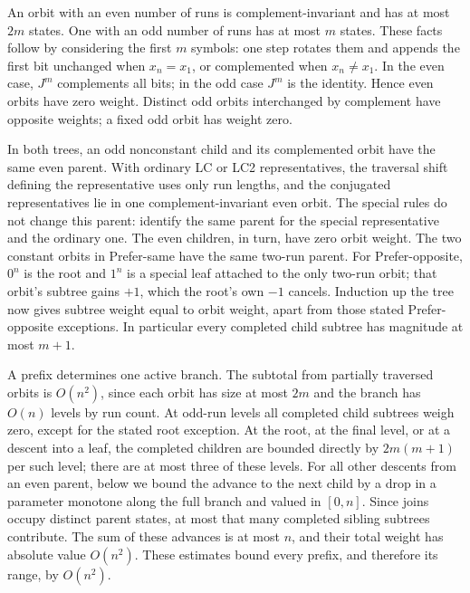 \documentclass[11pt]{article}
\begin{document}
An orbit with an even number of runs is complement-invariant
and has at most \(2m\) states. One with an odd number of
runs has at most \(m\) states. These facts follow by considering
the first \(m\) symbols: one step rotates them and appends
the first bit unchanged when \(x_n=x_1\), or complemented when
\(x_n\ne x_1\). In the even case, \(J^m\) complements all bits;
in the odd case \(J^m\) is the identity. Hence even orbits
have zero weight. Distinct odd orbits interchanged by complement
have opposite weights; a fixed odd orbit has weight zero.

In both trees, an odd nonconstant child and its complemented
orbit have the same even parent. With ordinary LC or LC2
representatives, the traversal shift defining the representative
uses only run lengths, and the conjugated representatives
lie in one complement-invariant even orbit. The special rules
do not change this parent: \cite[Sections 10 and 11, Case 1,
and Claims 30 and 33]{SalaSawadaAlhakim} identify the same parent for
the special representative and the ordinary one. The even
children, in turn, have zero orbit weight. The two constant
orbits in Prefer-same have the same two-run parent. For
Prefer-opposite, \(0^n\) is the root and \(1^n\) is a
special leaf attached to the only two-run orbit; that orbit's
subtree gains \(+1\), which the root's own \(-1\) cancels.
Induction up the tree now gives subtree weight equal to
orbit weight, apart from those stated Prefer-opposite
exceptions. In particular every completed child subtree
has magnitude at most \(m+1\).

A prefix determines one active branch. The subtotal from
partially traversed orbits is \(O(n^2)\), since each orbit
has size at most \(2m\) and the branch has \(O(n)\)
levels by run count. At odd-run levels all completed child
subtrees weigh zero, except for the stated root exception.
At the root, at the final level, or at a descent into
a leaf, the completed children are bounded directly by
\(2m(m+1)\) per such level; there are at most three of these
levels. For all other descents from an even parent, below
we bound the advance to the next child by a drop in a
parameter monotone along the full branch and valued in
\([0,n]\). Since joins occupy distinct parent states, at
most that many completed sibling subtrees contribute.
The sum of these advances is at most \(n\), and their
total weight has absolute value \(O(n^2)\). These estimates
bound every prefix, and therefore its range, by \(O(n^2)\).
\end{document}
